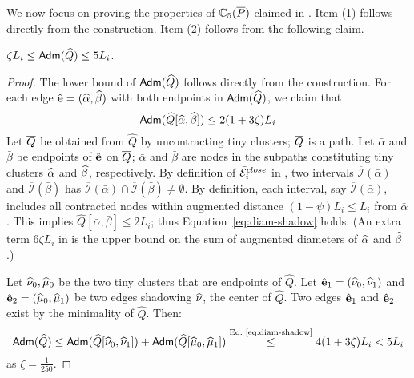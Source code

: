 We now focus on proving the properties of $\mathbb{C}_5(\overline{P})$  claimed in . Item (1) follows directly from the construction. Item (2) follows from the following claim.
\begin{claim} \label{clm:edm-IV}
	$\zeta L_i \leq \mathsf{Adm}(\widehat{Q}) \leq 5L_i$.
\end{claim}
\begin{proof}
	The lower bound of $ \mathsf{Adm}(\widehat{Q}) $ follows directly from the construction. For each edge $\hat{\mathbf{e}} = (\widehat{\alpha},\widehat{\beta})$  with both endpoints in $ \mathsf{Adm}(\widehat{Q})$, we claim that \begin{equation}\label{eq:diam-shadow}
		\mathsf{Adm}(\widehat{Q}[\widehat{\alpha},\widehat{\beta}]) \leq 2(1+3\zeta)L_i
	\end{equation}
	Let $\overline{Q}$ be obtained from $\widehat{Q}$ by uncontracting tiny clusters; $\overline{Q}$ is a path.  Let  $\bar{\alpha}$ and $\bar{\beta}$ be endpoints of $\hat{\mathbf{e}}$ on $\overline{Q}$; $\bar{\alpha}$ and $\bar{\beta}$  are nodes in the subpaths constituting tiny clusters  $\widehat{\alpha}$ and $\widehat{\beta}$, respectively. By definition  of $\bar{\mathcal{E}}_i^{close}$ in ,  two intervals $\overline{\mathcal{I}}(\bar{\alpha})$ and $\overline{\mathcal{I}}(\bar{\beta})$ has $\overline{\mathcal{I}}(\bar{\alpha})\cap \overline{\mathcal{I}}(\bar{\beta}) \not=\emptyset$. By definition, each interval, say $\overline{\mathcal{I}}(\bar{\alpha})$, includes all contracted nodes within augmented distance $(1-\psi)L_i \leq L_i$ from $\bar{\alpha}$. This implies $\widehat{Q}[\bar{\alpha}, \bar{\beta}]\leq 2L_i$; thus Equation~\eqref{eq:diam-shadow} holds.  (An extra term $6\zeta L_i$ in   is the upper bound on the sum of augmented diameters of $\widehat{\alpha}$ and $ \widehat{\beta}$.)
	
	
	Let $\widehat{\nu}_0, \widehat{\mu}_0$ be the two tiny clusters that are endpoints of $\widehat{Q}$. Let $\hat{\mathbf{e}}_1 = (\widehat{\nu}_0, \widehat{\nu}_1)$ and $\hat{\mathbf{e}}_2 = (\widehat{\mu}_0, \widehat{\mu}_1)$	be two edges shadowing $\widehat{\nu}$, the center of $\widehat{Q}$. Two edges $\hat{\mathbf{e}}_1$ and $\hat{\mathbf{e}}_2$ exist by the minimality of $\widehat{Q}$. Then:
	\begin{equation*}
		\mathsf{Adm}(\widehat{Q}) \leq \mathsf{Adm}(\widehat{Q}[\widehat{\nu}_0, \widehat{\nu}_1]) + \mathsf{Adm}(\widehat{Q}[\widehat{\mu}_0, \widehat{\mu}_1]) \stackrel{\text{Eq.~\eqref{eq:diam-shadow}}}{\leq} 4(1+3\zeta)L_i  < 5L_i
	\end{equation*}
	as $\zeta = \frac{1}{250}$.\QED
\end{proof}


